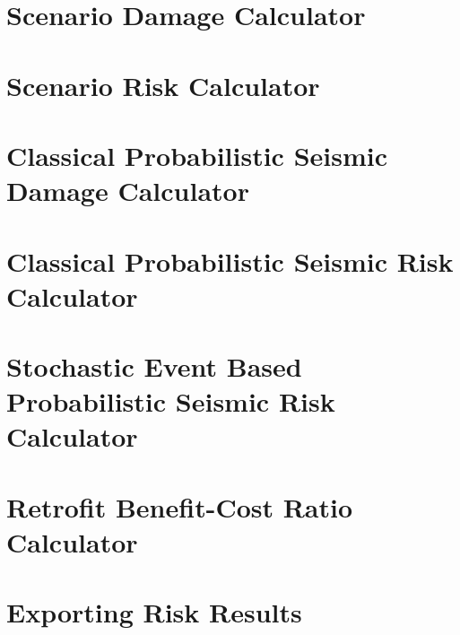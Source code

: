\section{Scenario Damage Calculator}
\label{sec:config_scenario_damage}


\section{Scenario Risk Calculator}
\label{sec:config_scenario_risk}


\section{Classical Probabilistic Seismic Damage Calculator}
\label{sec:config_classical_damage}


\section{Classical Probabilistic Seismic Risk Calculator}
\label{sec:config_classical_risk}


\section{Stochastic Event Based Probabilistic Seismic Risk Calculator}
\label{sec:config_event_based_risk}


\section{Retrofit Benefit-Cost Ratio Calculator}
\label{sec:config_benefit_cost}


\section{Exporting Risk Results}
\label{sec:risk_export}



\cleardoublepage